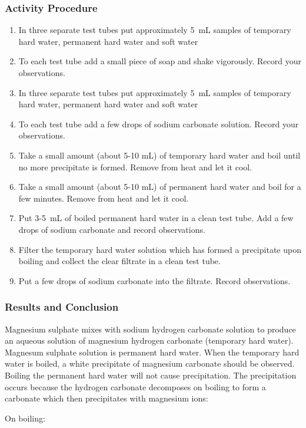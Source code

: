 {\subsubsection*{Activity Procedure}
\begin{enumerate}
\item{In three separate test tubes put approximately 5~mL samples of temporary hard water, permanent hard water and soft water}
\item{To each test tube add a small piece of soap and shake vigorously. Record your observations.}
\item{In three separate test tubes put approximately 5~mL samples of temporary hard water, permanent hard water and soft water}
\item{To each test tube add a few drops of sodium carbonate solution. Record your observations.}
\item{Take a small amount (about 5-10 mL) of temporary hard water and boil until no more precipitate is formed. Remove from heat and let it cool.}
\item{Take a small amount (about 5-10 mL) of permanent hard water and boil for a few minutes. Remove from heat and let it cool.}
\item{Put 3-5~mL of boiled permanent hard water in a clean test tube. Add a few drops of sodium carbonate and record observations.}
\item{Filter the temporary hard water solution which has formed a precipitate upon boiling and collect the clear filtrate in a clean test tube.}
\item{Put a few drops of sodium carbonate into the filtrate. Record observations.}
\end{enumerate}

\subsubsection*{Results and Conclusion}
Magnesium sulphate mixes with sodium hydrogen carbonate solution to produce  an aqueous solution of magnesium hydrogen carbonate (temporary hard water). Magnesum sulphate solution is permanent hard water. When the temporary hard water is boiled, a white precipitate of magnesium carbonate should be observed. Boiling the permanent hard water will not cause precipitation.
The precipitation occurs because the hydrogen carbonate decomposes on boiling to form a carbonate which then precipitates with magnesium ions:
\begin{center}
On boiling: \\


\end{center}}
